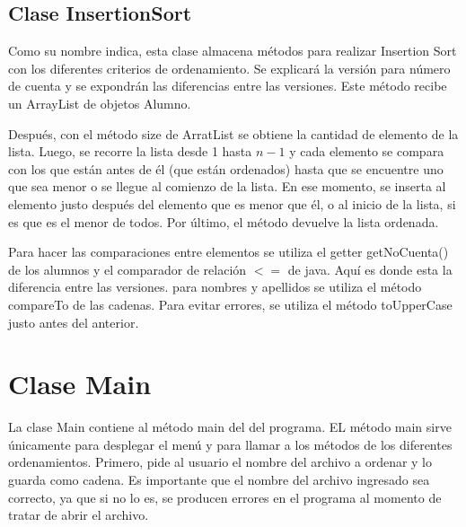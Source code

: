 \documentclass[11pt]{article}
\begin{document}
\subsection{Clase InsertionSort}
Como su nombre indica, esta clase almacena métodos para realizar Insertion Sort con los diferentes criterios de ordenamiento. Se explicará la versión para número de cuenta y se expondrán las diferencias entre las versiones. Este método recibe un ArrayList de objetos Alumno. 
\par
Después, con el método size de ArratList se obtiene la cantidad de elemento de la lista. Luego, se recorre la lista desde 1 hasta $n-1$ y cada elemento se compara con los que están antes de él (que están ordenados) hasta que se encuentre uno que sea menor o se llegue al comienzo de la lista. En ese momento, se inserta al elemento justo después del elemento que es menor que él, o al inicio de la lista, si es que es el menor de todos. Por último, el método devuelve la lista ordenada.
\par 
Para hacer las comparaciones entre elementos se utiliza el getter getNoCuenta() de los alumnos y el comparador de relación $<=$ de java. Aquí es donde esta la diferencia entre las versiones. para nombres y apellidos se utiliza el método compareTo de las cadenas. Para evitar errores, se utiliza el método toUpperCase justo antes del anterior.

\section{Clase Main}
La clase Main contiene al método main del del programa. EL método main sirve únicamente para desplegar el menú y para llamar a los métodos de los diferentes ordenamientos. Primero, pide al usuario el nombre del archivo a ordenar y lo guarda como cadena. Es importante que el nombre del archivo ingresado sea correcto, ya que si no lo es, se producen errores en el programa al momento de tratar de abrir el archivo.
\end{document}
